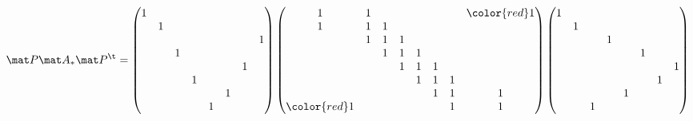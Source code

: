 \[
    \mat P \mat A_* \mat P^\t
    =
    \begin{pmatrix}
        1 & \\
          & 1 \\
          & & & & & & & 1 \\
          & & 1 \\
          & & & & & & 1 \\
          & & & 1 \\
          & & & & & 1 \\
          & & & & 1
    \end{pmatrix}
    \begin{pmatrix}
        1 & 1 &   &   &   &   &   & {\color{red} 1} \\
        1 & 1 & 1 &   &   &   &   &   \\
          & 1 & 1 & 1 &   &   &   &   \\
          &   & 1 & 1 & 1 &   &   &   \\
          &   &   & 1 & 1 & 1 &   &   \\
          &   &   &   & 1 & 1 & 1 &   \\
          &   &   &   &   & 1 & 1 & 1 \\
        {\color{red} 1} &   &   &   &   &   & 1 & 1 \\
    \end{pmatrix}
    \begin{pmatrix}
        1 & \\
          & 1 \\
          & & & 1 \\
          & & & & & 1 \\
          & & & & & & & 1 \\
          & & & & & & 1 \\
          & & & & 1 \\
          & & 1 \\
    \end{pmatrix}
\]

